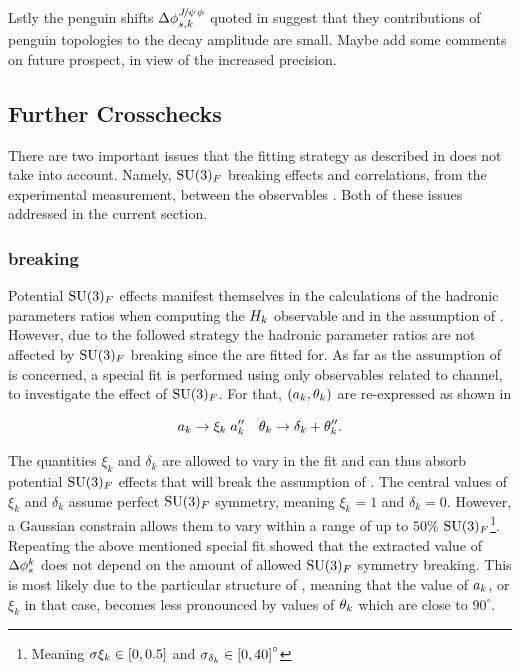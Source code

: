 Lstly the penguin shifts $\Delta\phi^{{J\mskip -3mu/\mskip -2mu\psi\mskip 2mu}\phi}_{s,{k}}$ quoted in 
suggest that they contributions of penguin topologies to the \BsJpsiPhi decay amplitude are small.
{\color{red} Maybe add some comments on future prospect, in view of the increased precision.}

\subsection{Further Crosschecks}
There are two important issues that the fitting strategy as described in 
does not take into account. Namely, $\mathrm{SU}(3)_F$ breaking effects and correlations, from the
experimental measurement, between the observables . Both of these issues
addressed in the current section.

\subsubsection{\grpsuthree breaking}
\label{su3_breaking}
Potential $\mathrm{SU}(3)_F$ effects manifest themselves in the calculations of the hadronic parameters ratios
when computing the $H_{k}$ observable and in the assumption of . However, due to the
followed strategy the hadronic parameter ratios are not affected by $\mathrm{SU}(3)_F$ breaking since the are fitted for.
As far as the assumption of  is concerned, a special fit is performed using only observables
related to \BdJpsiRho channel, to investigate the effect of $\mathrm{SU}(3)_F$. For that, $(a_k,\theta_k)$
are re-expressed as shown in 

\begin{equation}
  \centering
  \akPeng \to \xi_k \; \akPeng'' \quad \thkPeng \to \delta_k + \thkPeng''.
\label{su3_breaking_invoke}
\end{equation}

\noindent The quantities $\xi_k$ and $\delta_k$ are allowed to vary in the fit and can thus absorb
potential $\mathrm{SU}(3)_F$ effects that will break the assumption of .
The central values of $\xi_k$ and $\delta_k$ assume perfect $\mathrm{SU}(3)_F$ symmetry, meaning $\xi_k=1$ and $\delta_k=0$.
However, a Gaussian constrain allows them to vary within a range of up to $50\%$
$\mathrm{SU}(3)_F$\footnote{Meaning $\sigma{\xi_k}\in\left[ 0,0.5 \right]$ and $\sigma_{\delta_k}\in\left[ 0,40 \right]^\circ$ }.
Repeating the above mentioned special fit showed that the extracted value of $\Delta\phi_{s}^{k}$
does not depend on the amount of allowed $\mathrm{SU}(3)_F$ symmetry breaking.
This is most likely due to the particular structure of , meaning that
the value of $a_k$, or $\xi_k$ in that case, becomes less pronounced by values of
$\theta_k$ which are close to $90^\circ$.

